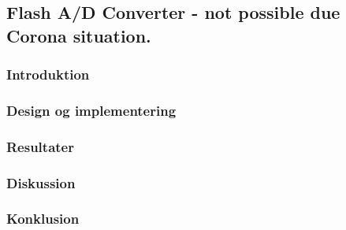 \subsection{Flash A/D Converter - not possible due Corona situation.}

\subsubsection{Introduktion}

\subsubsection{Design og implementering}
\subsubsection{Resultater}
\subsubsection{Diskussion}
\subsubsection{Konklusion}